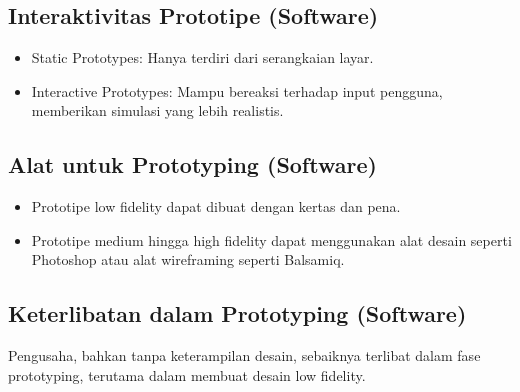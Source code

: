 \documentclass{article}
\begin{document}
\subsection{Interaktivitas Prototipe (Software)}
\begin{itemize}
    \item Static Prototypes: Hanya terdiri dari serangkaian layar.
    \item Interactive Prototypes: Mampu bereaksi terhadap input pengguna, memberikan simulasi yang lebih realistis.
\end{itemize}

\subsection{Alat untuk Prototyping (Software)}
\begin{itemize}
    \item Prototipe low fidelity dapat dibuat dengan kertas dan pena.
    \item Prototipe medium hingga high fidelity dapat menggunakan alat desain seperti Photoshop atau alat wireframing seperti Balsamiq.
\end{itemize}

\subsection{Keterlibatan dalam Prototyping (Software)}
Pengusaha, bahkan tanpa keterampilan desain, sebaiknya terlibat dalam fase prototyping, terutama dalam membuat desain low fidelity.
\end{document}
